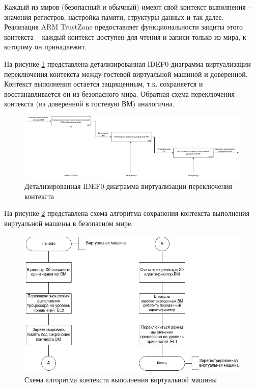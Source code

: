 Каждый из миров (безопасный и обычный) имеют свой контекст выполнения -- значения регистров, настройка памяти, структуры данных и так далее. Реализация ARM TrustZone предоставляет функциональности защиты этого контекста -- каждый контекст доступен для чтения и записи только из мира, к которому он принадлежит.

На рисунке \ref{fig:idef0-context-switch-2} представлена детализированная IDEF0-диаграмма виртуализации переключения контекста между гостевой виртуальной машиной и доверенной. Контекст выполнения остается защищенным, т.к. сохраняется и восстанавливается он из безопасного мира. Обратная схема переключения контекста (из доверенной в гостевую ВМ) аналогична.

\begin{figure}[h]
	\centering
	\includegraphics[width=\textwidth]{img/idef0-context-switch-2.pdf}
	\caption{Детализированная IDEF0-диаграмма виртуализации переключения контекста}
	\label{fig:idef0-context-switch-2}
\end{figure}

На рисунке \ref{fig:save-context-algo} представлена схема алгоритма сохранения контекста выполнения виртуальной машины в безопасном мире.

\begin{figure}[h]
	\centering
	\includegraphics[scale=0.6]{img/algo_2.jpg}
	\caption{Схема алгоритма контекста выполнения виртуальной машины}
	\label{fig:save-context-algo}
\end{figure}

